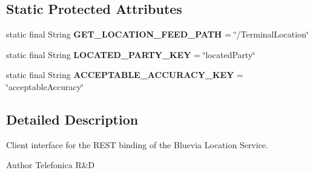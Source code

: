 \subsection*{Static Protected Attributes}
\begin{DoxyCompactItemize}
\item 
\hypertarget{classcom_1_1bluevia_1_1location_1_1client_1_1BVLocationClient_a4841e861d437e3bacdc21bc92b8469b7}{
static final String {\bfseries GET\_\-LOCATION\_\-FEED\_\-PATH} = \char`\"{}/TerminalLocation\char`\"{}}
\label{classcom_1_1bluevia_1_1location_1_1client_1_1BVLocationClient_a4841e861d437e3bacdc21bc92b8469b7}

\item 
\hypertarget{classcom_1_1bluevia_1_1location_1_1client_1_1BVLocationClient_a9b7c8a9ebb7640efa01dc8d4998ada0e}{
static final String {\bfseries LOCATED\_\-PARTY\_\-KEY} = \char`\"{}locatedParty\char`\"{}}
\label{classcom_1_1bluevia_1_1location_1_1client_1_1BVLocationClient_a9b7c8a9ebb7640efa01dc8d4998ada0e}

\item 
\hypertarget{classcom_1_1bluevia_1_1location_1_1client_1_1BVLocationClient_a40f2d10c9d9d8fe95530b9e152bb2de7}{
static final String {\bfseries ACCEPTABLE\_\-ACCURACY\_\-KEY} = \char`\"{}acceptableAccuracy\char`\"{}}
\label{classcom_1_1bluevia_1_1location_1_1client_1_1BVLocationClient_a40f2d10c9d9d8fe95530b9e152bb2de7}

\end{DoxyCompactItemize}


\subsection{Detailed Description}
Client interface for the REST binding of the Bluevia Location Service.

\begin{DoxyAuthor}{Author}
Telefonica R\&D 
\end{DoxyAuthor}


